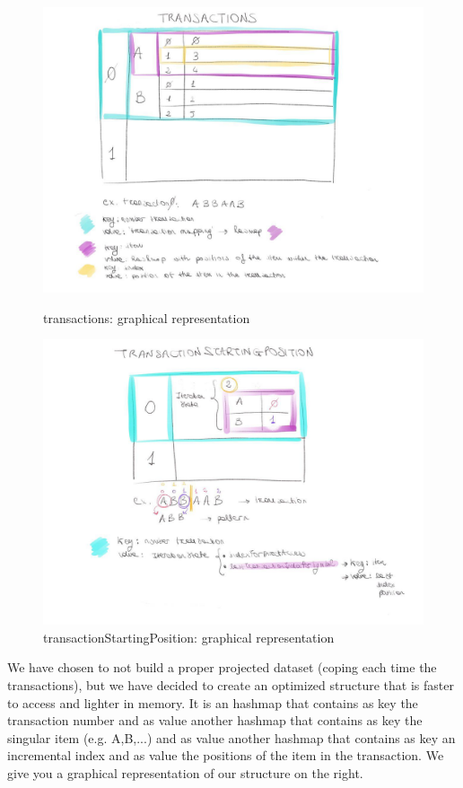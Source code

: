 \documentclass[10pt, a4paper]{article}
\begin{document}
	\begin{figure}
		\centering
		\includegraphics[scale =0.25]{transactions.jpg}
		\caption{{\small  transactions: graphical representation}}
		\vspace{0.5cm}
		\includegraphics[scale =0.25]{transactionStartingPosition.jpg}
		\caption{{\small transactionStartingPosition: graphical representation}}
	\end{figure}
	We have chosen to not build a proper projected dataset (coping each time the transactions), but we have decided to create an optimized structure that is faster to access and lighter in memory. It is an hashmap that contains as key the transaction number and as value another hashmap that contains as key the singular item (e.g. A,B,...) and as value another hashmap that contains as key an incremental index and as value the positions of the item in the transaction. We give you a graphical representation of our structure on the right.\newline
\end{document}
